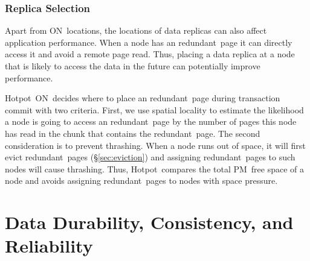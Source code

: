 \documentclass[sigconf]{acmart}
\newcommand{\nvm}{PM}
\newcommand{\hotpot}{Hotpot}
\newcommand{\on}{ON}
\newcommand{\redundant}{redundant}
\providecommand{\DIFaddbegin}{} %
\providecommand{\DIFaddend}{} %
\providecommand{\DIFdelbegin}{} %
\providecommand{\DIFdelend}{} %
\begin{document}
{%
\DIFdelbegin %

\DIFdelend {}
\DIFdelbegin %
\DIFdelend \subsubsection{Replica Selection}
\DIFdelbegin %
\DIFdelend Apart from \on\ locations, the locations of data replicas can also affect application performance.
When a node has an \redundant\ page it can directly access it and avoid a remote page read. 
Thus, placing a data replica at a node that is likely to access the data in the future
can potentially improve performance.

\hotpot\ \on\ decides where to place an \redundant\ page during transaction commit with two criteria. 
First, we use spatial locality to estimate the likelihood a node is going to access an \redundant\ page 
by the number of pages this node has read in the chunk that contains the \redundant\ page.
The second consideration is to prevent thrashing.
When a node runs out of space, it will first evict \redundant\ pages (\S\ref{sec:eviction})
and assigning \redundant\ pages to such nodes will cause thrashing.
Thus, \hotpot\ compares the total \nvm\ free space of a node and avoids assigning 
\redundant\ pages to nodes with space pressure.
\fi

\DIFdelbegin %

\DIFdelend \DIFaddbegin \section{Data Durability, Consistency, and Reliability}
\DIFaddend \label{sec:xact}
\DIFdelbegin %
\DIFdelend \DIFaddbegin 

}
\end{document}
